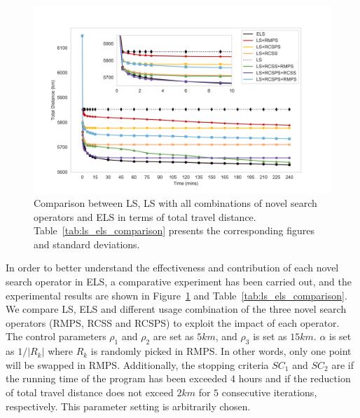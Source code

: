 \documentclass[journal]{IEEEtran}
\begin{document}
\begin{figure}[htbp]
	\centering
		\includegraphics[width=1\columnwidth]{ls_els_more_nostd.png}
	\caption{\label{ls_els_figure}
		Comparison between LS, LS with all combinations of novel search operators and ELS in terms of total travel distance. Table~\ref{tab:ls_els_comparison} presents the corresponding figures and standard deviations.}
\end{figure}

In order to better understand the effectiveness and contribution of each novel search operator in ELS, a comparative experiment has been carried out, and the experimental results are shown in Figure~\ref{ls_els_figure} and Table~\ref{tab:ls_els_comparison}. We compare LS, ELS and different usage combination of the three novel search operators (RMPS, RCSS and RCSPS) to exploit the impact of each operator. The control parameters $\rho_1$ and $\rho_2$ are set as $5km$, and $\rho_3$ is set as $15km$. $\alpha$ is set as $1/|R_k|$ where $R_k$ is randomly picked in RMPS. In other words, only one point will be swapped in RMPS. Additionally, the stopping criteria $SC_1$ and $SC_2$ are if the running time of the program has been exceeded 4 hours and if the reduction of total travel distance does not exceed $2km$ for $5$ consecutive iterations, respectively. This parameter setting is arbitrarily chosen.
\end{document}
